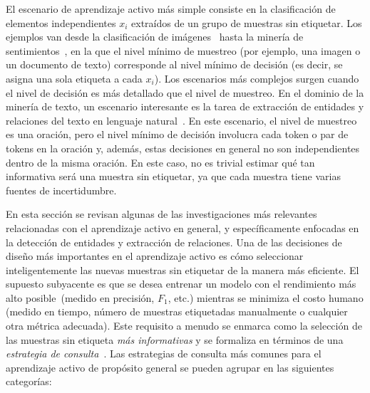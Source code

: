 El escenario de aprendizaje activo más simple consiste en la clasificación de elementos independientes $x_i$ extraídos de un grupo de muestras sin etiquetar.
Los ejemplos van desde la clasificación de imágenes~\cite{Gal2017DeepBA} hasta la minería de sentimientos~\cite{Kranjc2015ActiveLF}, en la que el nivel mínimo de muestreo (por ejemplo, una imagen o un documento de texto) corresponde al nivel mínimo de decisión (es decir, se asigna una sola etiqueta a cada $x_i$).
Los escenarios más complejos surgen cuando el nivel de decisión es más detallado que el nivel de muestreo.
En el dominio de la minería de texto, un escenario interesante es la tarea de extracción de entidades y relaciones del texto en lenguaje natural~\cite{zhang2012unified}.
En este escenario, el nivel de muestreo es una oración, pero el nivel mínimo de decisión involucra cada token o par de tokens en la oración y, además, estas decisiones en general no son independientes dentro de la misma oración.
En este caso, no es trivial estimar qué tan informativa será una muestra sin etiquetar, ya que cada muestra tiene varias fuentes de incertidumbre.

En esta sección se revisan algunas de las investigaciones más relevantes relacionadas con el aprendizaje activo en general, y específicamente enfocadas en la detección de entidades y extracción de relaciones.
Una de las decisiones de diseño más importantes en el aprendizaje activo es cómo seleccionar inteligentemente las nuevas muestras sin etiquetar de la manera más eficiente.
El supuesto subyacente es que se desea entrenar un modelo con el rendimiento más alto posible~(medido en precisión, $F_1$, etc.) mientras se minimiza el costo humano (medido en tiempo, número de muestras etiquetadas manualmente o cualquier otra métrica adecuada).
Este requisito a menudo se enmarca como la selección de las muestras sin etiqueta \textit{más informativas} y se formaliza en términos de una \textit{estrategia de consulta}~\cite{seungquery}.
Las estrategias de consulta más comunes para el aprendizaje activo de propósito general se pueden agrupar en las siguientes categorías:


